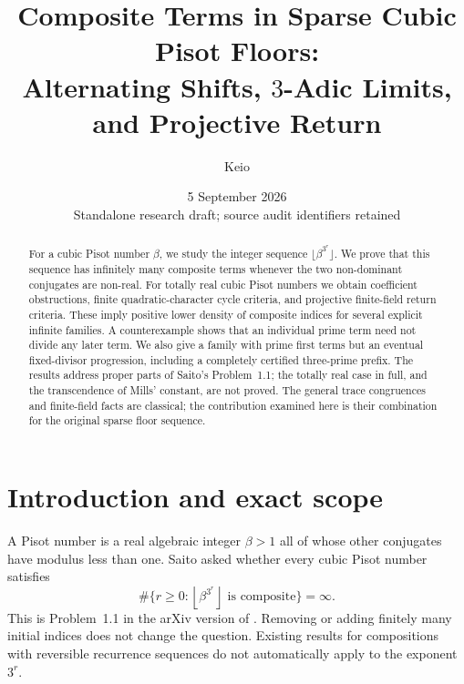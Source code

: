 \documentclass[11pt,a4paper]{article}
\author{Keio}
\date{5 September 2026\\\small Standalone research draft; source audit identifiers retained}
\title{Composite Terms in Sparse Cubic Pisot Floors:\\Alternating Shifts, $3$-Adic Limits, and Projective Return}
\theoremstyle{definition}\newtheorem{definition}[theorem]{Definition}
\theoremstyle{remark}\newtheorem{remark}[theorem]{Remark}
\newcommand{\floor}[1]{\left\lfloor #1\right\rfloor}\newcommand{\ceil}[1]{\left\lceil #1\right\rceil}
\begin{document}
\maketitle
\begin{abstract}
For a cubic Pisot number $\beta$, we study the integer sequence $\lfloor\beta^{3^r}\rfloor$. We prove that this sequence has infinitely many composite terms whenever the two non-dominant conjugates are non-real. For totally real cubic Pisot numbers we obtain coefficient obstructions, finite quadratic-character cycle criteria, and projective finite-field return criteria. These imply positive lower density of composite indices for several explicit infinite families. A counterexample shows that an individual prime term need not divide any later term. We also give a family with prime first terms but an eventual fixed-divisor progression, including a completely certified three-prime prefix. The results address proper parts of Saito's Problem~1.1; the totally real case in full, and the transcendence of Mills' constant, are not proved. The general trace congruences and finite-field facts are classical; the contribution examined here is their combination for the original sparse floor sequence.
\end{abstract}
\tableofcontents

\section{Introduction and exact scope}
A Pisot number is a real algebraic integer $\beta>1$ all of whose other conjugates have modulus less than one. Saito asked whether every cubic Pisot number satisfies
\begin{equation}\label{eq:problem}
 \#\{r\ge0:\floor{\beta^{3^r}}\text{ is composite}\}=\infty.
\end{equation}
This is Problem~1.1 in the arXiv version of \cite{saito-intervals}. Removing or adding finitely many initial indices does not change the question. Existing results for compositions with reversible recurrence sequences do not automatically apply to the exponent $3^r$.
\end{document}
